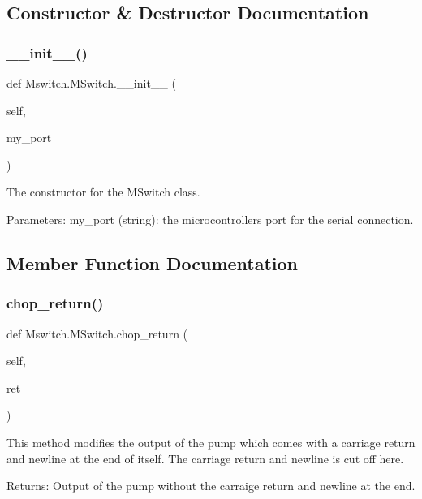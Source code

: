 \subsection{Constructor \& Destructor Documentation}
\mbox{\label{class_mswitch_1_1_m_switch_a0fb0dfae18d749480c2f1951f8d33e7d}} 
\subsubsection{\texorpdfstring{\_\_init\_\_()}{\_\_init\_\_()}}
{\footnotesize\ttfamily def Mswitch.\+M\+Switch.\+\_\+\+\_\+init\+\_\+\+\_\+ (\begin{DoxyParamCaption}\item[{}]{self,  }\item[{}]{my\+\_\+port }\end{DoxyParamCaption})}

\begin{DoxyVerb}The constructor for the MSwitch class.

Parameters:
    my_port (string): the microcontrollers port for the serial connection.
\end{DoxyVerb}
 

\subsection{Member Function Documentation}
\mbox{\label{class_mswitch_1_1_m_switch_a7f9619b4aa0ad0e06121c6c52b13dca4}} 
\subsubsection{\texorpdfstring{chop\_return()}{chop\_return()}}
{\footnotesize\ttfamily def Mswitch.\+M\+Switch.\+chop\+\_\+return (\begin{DoxyParamCaption}\item[{}]{self,  }\item[{}]{ret }\end{DoxyParamCaption})}

\begin{DoxyVerb}This method modifies the output of the pump which comes with a carriage return and newline at the end of itself.
The carriage return and newline is cut off here.

Returns:
    Output of the pump without the carraige return and newline at the end.
\end{DoxyVerb}
 \mbox{\label{class_mswitch_1_1_m_switch_a340f3cb2d10d8fc3681c6f215201d331}} 
